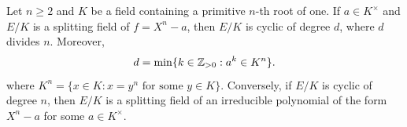 


\begin{proposition}
    Let $n\geq2$ and $K$ be a field containing a primitive $n$-th root of one. If 
    $a\in K^{\times}$ and 
    $E/K$ is a splitting field of $f=X^n-a$, then $E/K$ is cyclic
    of degree $d$, where $d$ divides $n$. Moreover, 
    \[
    d=\min\{k\in\mathbb{Z}_{>0}:a^k\in K^n\}.
    \]
    where $K^n=\{x\in K:x=y^n\text{ for some $y\in K$}\}$. 
    Conversely, 
    if $E/K$ is cyclic of degree $n$, then $E/K$ is a splitting
    field of an irreducible polynomial 
    of the form $X^n-a$ for some $a\in K^{\times}$. 
\end{proposition}

